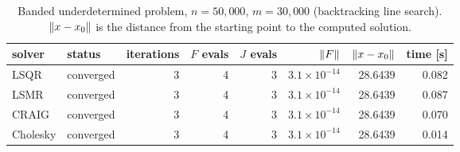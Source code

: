 \begin{table}[htbp]
\centering
\caption{Banded underdetermined problem, $n = 50{,}000$, $m = 30{,}000$ (backtracking line search). $\left\lVert x - x_0 \right\rVert$ is the distance from the starting point to the computed solution.}
\label{tab:scaling}
\small
\begin{tabular}{@{}llrrrrrr@{}}
\toprule
solver & status & iterations & $F$ evals & $J$ evals & $\left\lVert F \right\rVert$ & $\left\lVert x-x_0 \right\rVert$ & time [s] \\
\midrule
LSQR & converged & 3 & 4 & 3 & $3.1\times10^{-14}$ & 28.6439 & 0.082 \\
LSMR & converged & 3 & 4 & 3 & $3.1\times10^{-14}$ & 28.6439 & 0.087 \\
CRAIG & converged & 3 & 4 & 3 & $3.1\times10^{-14}$ & 28.6439 & 0.070 \\
Cholesky & converged & 3 & 4 & 3 & $3.1\times10^{-14}$ & 28.6439 & 0.014 \\
\bottomrule
\end{tabular}
\end{table}
